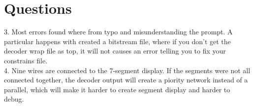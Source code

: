 \documentclass[11pt]{article}
\begin{document}
\section*{Questions}
3. Most errors found where from typo and misunderstanding the prompt. A particular happens with created a bitstream file, where if you don't get the decoder wrap file as top, it will not causes an error telling you to fix your constrains file. \\
4. Nine wires are connected to the 7-segment display. If the segments were not all connected together, the decoder output will create a piority network instead of a parallel, which will make it harder to create segment display and harder to debug. 
\end{document}
